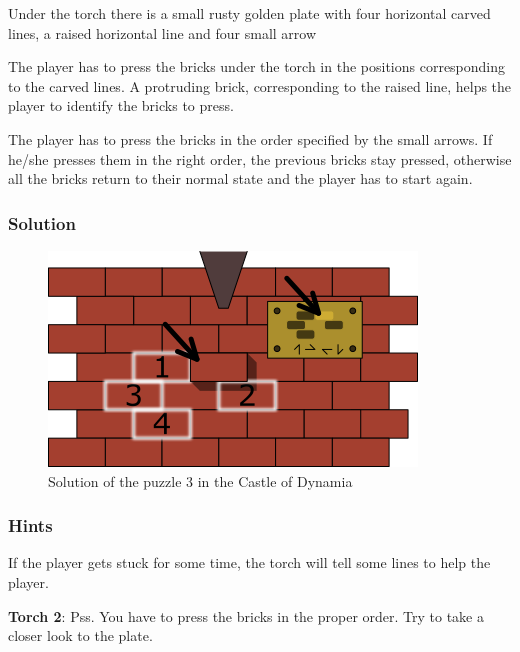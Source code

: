 

Under the torch there is a small rusty golden plate with four horizontal carved lines, a raised horizontal line and four small arrow

The player has to press the bricks under the torch in the positions corresponding to the carved lines. A protruding brick, corresponding to the raised line, helps the player to identify the bricks to press.

The player has to press the bricks in the order specified by the small arrows. If he/she presses them in the right order, the previous bricks stay pressed, otherwise all the bricks return to their normal state and the player has to start again.

\subsubsection*{Solution}
\begin{figure}[H]
  \centering
  \includegraphics[width=\textwidth]{Images/Puzzles/castleOfDynamia3Solution}
  \caption{Solution of the puzzle 3 in the Castle of Dynamia}
\end{figure}

\subsubsection*{Hints}
If the player gets stuck for some time, the torch will tell some lines to help the player.

\textbf{Torch 2}: Pss. You have to press the bricks in the proper order. Try to take a closer look to the plate.

